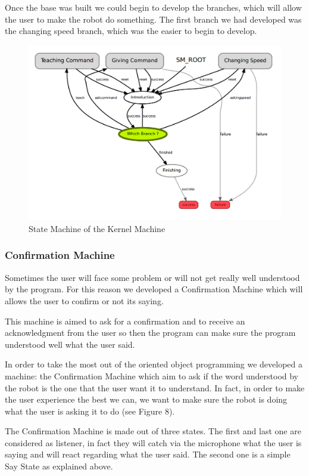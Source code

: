 Once the base was built we could begin to develop the branches, which will allow the user to make the robot do something.  The first branch we had developed was the changing speed branch, which was the easier to begin to develop. 


 \begin{figure}
 \center
 \includegraphics[width=14cm]{img_SM/KernelMachine.png}
 \caption{State Machine of the Kernel Machine}
 \end{figure}

\subsubsection{Confirmation Machine}
Sometimes the user will face some problem or will not get really well understood by the program. For this reason we developed a Confirmation Machine which will allows the user to confirm or not its saying.

This machine is aimed to ask for a confirmation and to receive an acknowledgment from the user so then the program can make sure the program understood well what the user said.

In order to take the most out of the oriented object programming we developed a machine: the Confirmation Machine which aim to ask if the word understood by the robot is the one that the user want it to understand. In fact, in order to make the user experience the best we can, we want to make sure the robot is doing what the user is asking it to do (see Figure 8).

The Confirmation Machine is made out of three states. The first and last one are considered as listener, in fact they will catch via the microphone what the user is saying and will react regarding what the user said. The second one is a simple Say State as explained above. 

